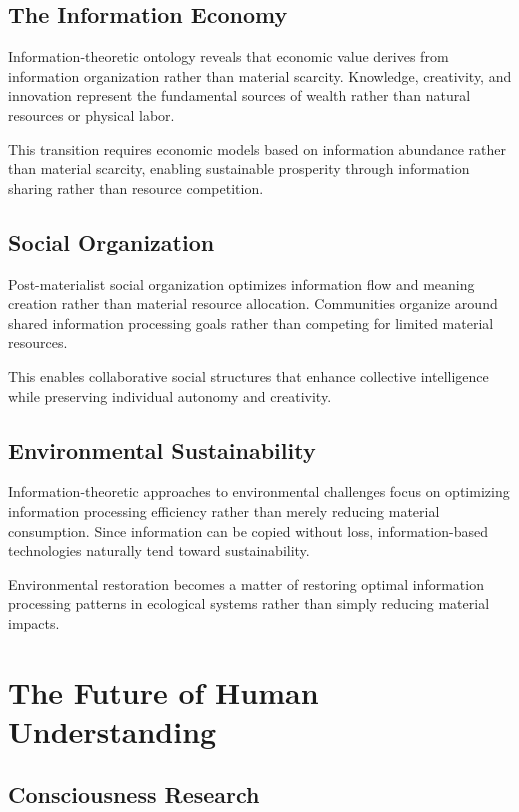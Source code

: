 \documentclass[12pt]{article}
\begin{document}
\subsection{The Information Economy}

Information-theoretic ontology reveals that economic value derives from information organization rather than material scarcity. Knowledge, creativity, and innovation represent the fundamental sources of wealth rather than natural resources or physical labor.

This transition requires economic models based on information abundance rather than material scarcity, enabling sustainable prosperity through information sharing rather than resource competition.

\subsection{Social Organization}

Post-materialist social organization optimizes information flow and meaning creation rather than material resource allocation. Communities organize around shared information processing goals rather than competing for limited material resources.

This enables collaborative social structures that enhance collective intelligence while preserving individual autonomy and creativity.

\subsection{Environmental Sustainability}

Information-theoretic approaches to environmental challenges focus on optimizing information processing efficiency rather than merely reducing material consumption. Since information can be copied without loss, information-based technologies naturally tend toward sustainability.

Environmental restoration becomes a matter of restoring optimal information processing patterns in ecological systems rather than simply reducing material impacts.

\section{The Future of Human Understanding}

\subsection{Consciousness Research}
\end{document}
